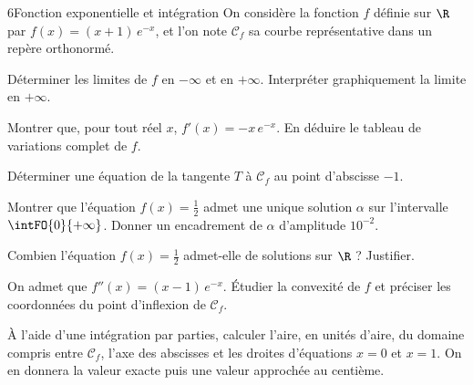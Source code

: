 \begin{exoBac}{6}{Fonction exponentielle et intégration}
On considère la fonction $f$ définie sur $\R$ par $f(x)=(x+1)\,e^{-x}$, et l'on note $\mathcal{C}_f$ sa courbe représentative dans un
repère orthonormé.

\begin{questions}
  \item Déterminer les limites de $f$ en $-\infty$ et en $+\infty$. Interpréter graphiquement la limite en $+\infty$.
  \item Montrer que, pour tout réel $x$, $f'(x)=-x\,e^{-x}$. En déduire le tableau de variations complet de $f$.
  \item Déterminer une équation de la tangente $T$ à $\mathcal{C}_f$ au point d'abscisse $-1$.
\end{questions}

\begin{questions}[resume]
  \item Montrer que l'équation $f(x)=\frac12$ admet une unique solution $\alpha$ sur l'intervalle $\intFO{0}{+\infty}$. Donner un
    encadrement de $\alpha$ d'amplitude $10^{-2}$.
  \item Combien l'équation $f(x)=\frac12$ admet-elle de solutions sur $\R$ ? Justifier.
\end{questions}

\begin{questions}[resume]
  \item On admet que $f''(x)=(x-1)\,e^{-x}$. Étudier la convexité de $f$ et préciser les coordonnées du point d'inflexion de $\mathcal{C}_f$.
  \item À l'aide d'une intégration par parties, calculer l'aire, en unités d'aire, du domaine compris entre $\mathcal{C}_f$, l'axe des
    abscisses et les droites d'équations $x=0$ et $x=1$. On en donnera la valeur exacte puis une valeur approchée au centième.
\end{questions}
\end{exoBac}

